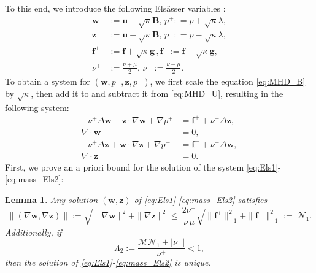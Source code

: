 \documentclass[3p]{elsarticle}
\newtheorem{lemma}[theorem]{Lemma}
\def\nuplus{\nu^{+}}
\def\numinus{\nu^{-}}
\def\pplus{p^{+}}
\def\pminus{p^{-}}
\def\fplus{\mathbf{f}^{+}}
\def\fminus{\mathbf{f}^{-}}
\def\V#1{\mathbf{#1}}
\newcommand{\Mbd}{\mathcal{M}}
\newcommand{\Nbd}{\mathcal{N}}
\begin{document}
To this end, we introduce the following Els{\"a}sser variables \cite{AGGUL202372}:
\begin{equation}
    \label{eq:ElsVariables}
    \begin{aligned}
    \V{w} &:= \V{u} + \sqrt{\kappa}\V{B}, \, \pplus: = p + \sqrt{\kappa} \lambda, \\
    \V{z} &:= \V{u}  - \sqrt{\kappa}\V{B}, \, \pminus: = p - \sqrt{\kappa} \lambda, \\
    \fplus &:=  \V{f} + \sqrt{\kappa} \V{g}\, , \fminus:=  \V{f} - \sqrt{\kappa}\V{g}, \\
    \nuplus &:=\frac{\nu+\mu}{2}, \, \numinus :=\frac{\nu-\mu}{2}.
    \end{aligned}
\end{equation}
To obtain a system for $(\V{w},\pplus,\V{z},\pminus)$, we first scale the equation \eqref{eq:MHD_B} by $\sqrt{\kappa}$, then add it to and subtract it from \eqref{eq:MHD_U}, resulting in the following system:
\begin{align}
 - \nuplus \Delta \V{w} + \V{z} \cdot \nabla \V{w} + \nabla \pplus 
 & = \fplus  + \numinus \Delta \V{z}
, \label{eq:Els1} \\
\nabla \cdot \V{w} &= 0, \label{eq:mass_Els1} 
\\
- \nuplus \Delta \V{z} + \V{w} \cdot \nabla \V{z} + \nabla \pminus  
& 
=  \fminus + \numinus \Delta \V{w}, \label{eq:Els2} \\
\nabla \cdot \V{z} &= 0. \label{eq:mass_Els2}
\end{align}
First, we prove an a priori bound for the solution of the system \eqref{eq:Els1}-\eqref{eq:mass_Els2}:
\begin{lemma}\label{lem:Stability_Els}
Any solution $(\V{w},\V{z})$ of \eqref{eq:Els1}-\eqref{eq:mass_Els2} satisfies 
\begin{equation}\label{eq:Stability_Els}
 \|(\nabla \V{w},\nabla \V{z})\|:=\sqrt{\| \nabla \V{w} \|^2 + \| \nabla \V{z} \|^2} \le \,
\frac{2\nuplus}{\nu\, \mu} 
\sqrt{\|\fplus\|^2_{-1}+\|\fminus\|^2_{-1}} := \; \Nbd_1.
\end{equation}
Additionally, if 
%
\begin{equation}
	\Lambda_2 := \frac{\Mbd \Nbd_1+|\numinus|}{\nuplus} < 1,
    \label{eq:smalldataUniq_Els}
\end{equation}
then the solution of \eqref{eq:Els1}-\eqref{eq:mass_Els2} is unique. 
\end{lemma}
\end{document}
